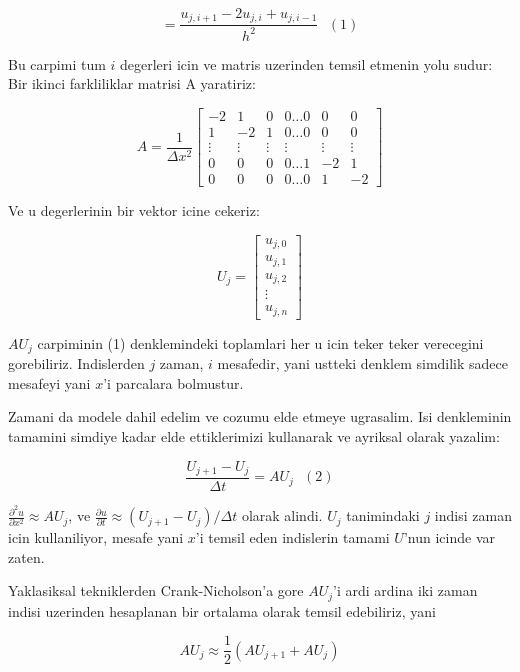 \documentclass[12pt,fleqn]{article}\usepackage{../common}
\begin{document}
\begin{equation} 
= \frac{u_{j,i+1}-2u_{j,i}+u_{j,i-1}}{h^2} 
\ \ \ (1)
\end{equation}

Bu carpimi tum $i$ degerleri icin ve matris uzerinden temsil etmenin yolu sudur:
Bir ikinci farkliliklar matrisi A yaratiriz:

$$ 
A = \frac{1}{\Delta x^2}
\left[ \begin{array}{ccccccc}
-2 & 1 & 0 & 0 \ldots 0 & 0 & 0 \\
1 & -2 & 1 & 0 \ldots 0 & 0 & 0 \\
\vdots & \vdots & \vdots & \vdots & \vdots & \vdots \\
0 & 0 & 0 & 0 \ldots 1 & -2 & 1 \\
0 & 0 & 0 & 0 \ldots 0 & 1 & -2
\end{array} \right]
 $$

Ve u degerlerinin bir vektor icine cekeriz:

$$ U_j =
\left[ \begin{array}{c}
u_{j,0} \\
u_{j,1} \\
u_{j,2} \\
\vdots \\
u_{j,n}
\end{array} \right]
 $$

$AU_j$ carpiminin (1) denklemindeki toplamlari her u icin teker teker
verecegini gorebiliriz. Indislerden $j$ zaman, $i$ mesafedir, yani ustteki
denklem simdilik sadece mesafeyi yani $x$'i parcalara bolmustur.

Zamani da modele dahil edelim ve cozumu elde etmeye ugrasalim. Isi
denkleminin tamamini simdiye kadar elde ettiklerimizi kullanarak ve
ayriksal olarak yazalim:

\begin{equation}
\frac{U_{j+1}-U_j}{\Delta t} = AU_j 
\ \ \ (2)
\end{equation}

$\frac{\partial^2u}{\partial x^2} \approx AU_j$, ve $\frac{\partial
  u}{\partial t} \approx (U_{j+1}-U_j) / \Delta t$ olarak
alindi. $U_j$ tanimindaki $j$ indisi zaman icin kullaniliyor, mesafe
yani $x$'i temsil eden indislerin tamami $U$'nun icinde var zaten.

Yaklasiksal tekniklerden Crank-Nicholson'a gore $AU_j$'i ardi ardina
iki zaman indisi uzerinden hesaplanan bir ortalama olarak temsil
edebiliriz, yani

$$ AU_j \approx \frac{1}{2}(AU_{j+1}+AU_j) $$
\end{document}
